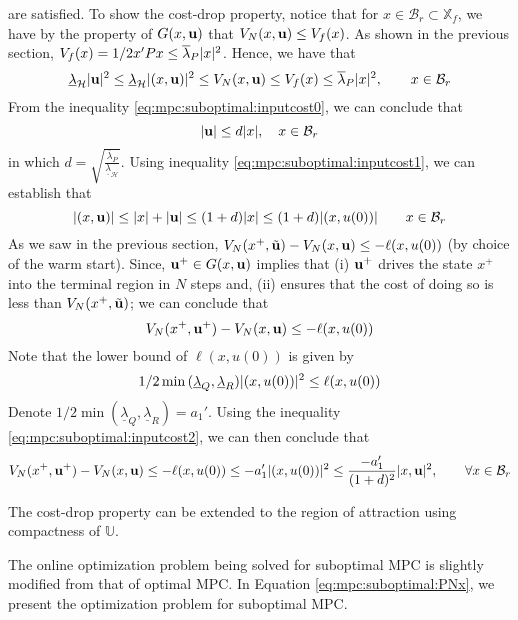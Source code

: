 are satisfied. To show the cost-drop property, notice that for $x \in
\mathcal{B}_r \subset \mathbb{X}_f$, we have by the property of
$G(x,\mathbf{u})$ that $V_N(x,\mathbf{u}) \leq V_f(x)$. As shown in the previous
section, $V_f(x) = 1/2x'Px \leq \overline{\lambda}_P\vert x \vert^2$. Hence,
we have that 
\begin{equation}
\label{eq:mpc:suboptimal:inputcost0}
\underline{\lambda}_{\mathcal{H}}\vert \mathbf{u} \vert^2 \leq \underline{\lambda}_{\mathcal{H}}\vert (x,\mathbf{u}) \vert^2 \leq V_N(x,\mathbf{u})
\leq V_f(x) \leq  \overline{\lambda}_P\vert x \vert^2 ,\qquad x \in
\mathcal{B}_r
\end{equation}
From the inequality \eqref{eq:mpc:suboptimal:inputcost0}, we can conclude that 
\begin{equation}
\label{eq:mpc:suboptimal:inputcost1}
\vert \mathbf{u} \vert \leq d
\vert x \vert, \quad x \in \mathcal{B}_r
\end{equation}
in which $d =
\sqrt{\frac{\overline{\lambda}_P}{\underline{\lambda}_{\mathcal{H}}}}$. Using
 inequality \eqref{eq:mpc:suboptimal:inputcost1}, we can establish
 that
\begin{equation}
\label{eq:mpc:suboptimal:inputcost2}
\vert (x,\mathbf{u}) \vert \leq
\vert x \vert+\vert \mathbf{u} \vert \leq (1+d)\vert x \vert \leq (1+d)\vert (x,u(0)) \vert
\qquad x \in \mathcal{B}_r
\end{equation}
As we saw in the previous section, $V_N(x^+,\tilde{\mathbf{u}})-V_N(x,\mathbf{u}) \leq
-\ell(x,u(0))$ (by choice of the warm start). Since, $\mathbf{u}^+ \in G(x,\mathbf{u})$ implies that (i)
$\mathbf{u}^+$ drives the state $x^+$ into the terminal region in $N$ steps
and, (ii) ensures that the cost of doing so is less than
$V_N(x^+,\tilde{\mathbf{u}})$; we can conclude that
\[V_N(x^+,\mathbf{u}^+)-V_N(x,\mathbf{u}) \leq -\ell(x,u(0))\]
Note that the lower
bound of $\ell(x,u(0))$ is given by
\[1/2\min{(\underline{\lambda}_Q,\underline{\lambda}_R)}\vert (x,u(0)) \vert^2
\leq  \ell(x,u(0))\]
Denote $1/2\min{(\underline{\lambda}_Q,\underline{\lambda}_R)} =
a_1'$. Using the inequality \eqref{eq:mpc:suboptimal:inputcost2}, we
can then conclude that 
\[ V_N(x^+,\mathbf{u}^+)-V_N(x,\mathbf{u}) \leq -\ell(x,u(0)) \leq
-a_1'\vert (x,u(0)) \vert^2 \leq \frac{-a_1'}{(1+d)^2}\vert x,\mathbf{u} \vert^2 ,\qquad
\forall x \in \mathcal{B}_r\]

The cost-drop property can be extended to the region of attraction
using compactness of $\mathbb{U}$.

The online optimization problem being solved for suboptimal MPC is 
slightly modified from that of optimal MPC. In Equation
\eqref{eq:mpc:suboptimal:PNx}, we present the optimization problem for
suboptimal MPC.

